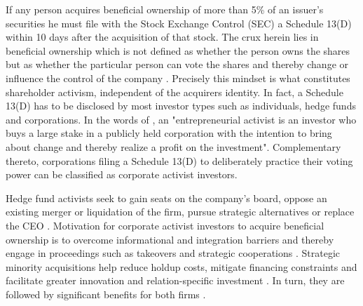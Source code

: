 \documentclass[12pt]{article}
\begin{document}
If any person acquires beneficial ownership of more than 5\% of an issuer's securities he must file with the Stock Exchange Control (SEC) a Schedule 13(D) within 10 days after the acquisition of that stock. The crux herein lies in beneficial ownership which is not defined as whether the person owns the shares but as whether the particular person can vote the shares and thereby change or influence the control of the company \citep[p.24]{Morrison2015}. Precisely this mindset is what constitutes shareholder activism, independent of the acquirers identity. In fact, a Schedule 13(D) has to be disclosed by most investor types such as individuals, hedge funds and corporations. In the words of \citet[p.187]{Klein2009}, an "entrepreneurial activist is an investor who buys a large stake in a publicly held corporation with the intention to bring about change and thereby realize a profit on the investment". Complementary thereto, corporations filing a Schedule 13(D) to deliberately practice their voting power can be classified as corporate activist investors. 

Hedge fund activists seek to gain seats on the company's board, oppose an existing merger or liquidation of the firm, pursue strategic alternatives or replace the CEO \citep[p.188]{Klein2009}. Motivation for corporate activist investors to acquire beneficial ownership is to overcome informational and integration barriers and thereby engage in proceedings such as takeovers and strategic cooperations \citep[p.1]{Huang2017}. Strategic minority acquisitions help reduce holdup costs, mitigate financing constraints and facilitate greater innovation and relation-specific investment \citep[p.825]{Wang2014}. In turn, they are followed by significant benefits for both firms \citep[p.2793]{Allen2000}.
\end{document}
